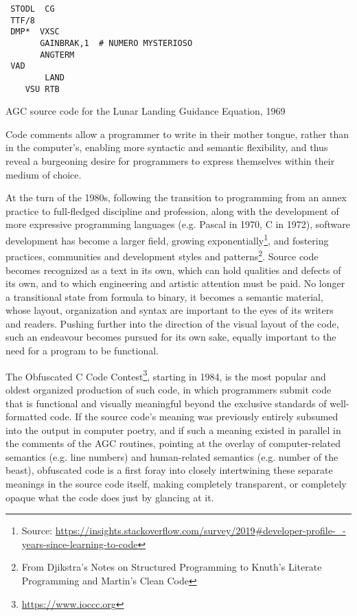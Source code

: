 \begin{listing}
  \begin{verbatim}
 STODL  CG
 TTF/8
 DMP*  VXSC
       GAINBRAK,1  # NUMERO MYSTERIOSO
       ANGTERM
 VAD
	    LAND
    VSU	RTB
\end{verbatim}
  \caption{AGC source code for the Lunar Landing Guidance Equation, 1969}
  \label{code:numero_mysterioso_asm}
\end{listing}

Code comments allow a programmer to write in their mother tongue, rather than in the computer's, enabling more syntactic and semantic flexibility, and thus reveal a burgeoning desire for programmers to express themselves within their medium of choice.

At the turn of the 1980s, following the transition to programming from an annex practice to full-fledged discipline and profession, along with the development of more expressive programming languages (e.g. Pascal in 1970, C in 1972), software development has become a larger field, growing exponentially\footnote{Source: \url{https://insights.stackoverflow.com/survey/2019\#developer-profile-_-years-since-learning-to-code}}, and fostering practices, communities and development styles and patterns\footnote{From Djikstra's Notes on Structured Programming to Knuth's Literate Programming and Martin's Clean Code}. Source code becomes recognized as a text in its own, which can hold qualities and defects of its own, and to which engineering and artistic attention must be paid. No longer a transitional state from formula to binary, it becomes a semantic material, whose layout, organization and syntax are important to the eyes of its writers and readers. Pushing further into the direction of the visual layout of the code, such an endeavour becomes pursued for its own sake, equally important to the need for a program to be functional.

The Obfuscated C Code Contest\footnote{\url{https://www.ioccc.org}}, starting in 1984, is the most popular and oldest organized production of such code, in which programmers submit code that is functional and visually meaningful beyond the exclusive standards of well-formatted code. If the source code's meaning was previously entirely subsumed into the output in computer poetry, and if such a meaning existed in parallel in the comments of the AGC routines, pointing at the overlay of computer-related semantics (e.g. line numbers) and human-related semantics (e.g. number of the beast), obfuscated code is a first foray into closely intertwining these separate meanings in the source code itself, making completely transparent, or completely opaque what the code does just by glancing at it.

